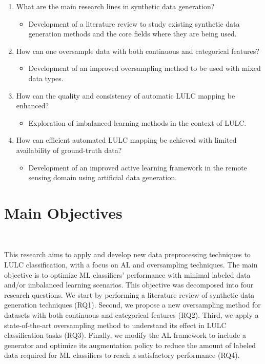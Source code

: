 \begin{enumerate}
    \item What are the main research lines in synthetic data generation?
          \begin{itemize}
              \item Development of a literature review to study existing
                  synthetic data generation methods and the core fields where
                  they are being used.
          \end{itemize}
    \item How can one oversample data with both continuous and categorical
        features? 
        \begin{itemize}
            \item Development of an improved oversampling method to be used
                with mixed data types.
        \end{itemize}
    \item How can the quality and consistency of automatic LULC mapping be
        enhanced?
          \begin{itemize}
              \item Exploration of imbalanced learning methods in the context
                  of LULC\@.
          \end{itemize}
    \item How can efficient automated LULC mapping be achieved with limited
        availability of ground-truth data?
        \begin{itemize}
            \item Development of an improved active learning framework in the
                remote sensing domain using artificial data generation.
        \end{itemize}
\end{enumerate}

\section{Main Objectives}~\label{sec:main_objectives}

This research aims to apply and develop new data preprocessing techniques to
LULC classification, with a focus on AL and oversampling techniques. The main
objective is to optimize ML classifiers' performance with minimal labeled data
and/or imbalanced learning scenarios. This objective was decomposed into four
research questions. We start by performing a literature review of synthetic
data generation techniques (RQ1). Second, we propose a new oversampling method
for datasets with both continuous and categorical features (RQ2). Third, we
apply a state-of-the-art oversampling method to understand its effect in LULC
classification tasks (RQ3). Finally, we modify the AL framework to include a
generator and optimize its augmentation policy to reduce the amount of labeled
data required for ML classifiers to reach a satisfactory performance (RQ4).


